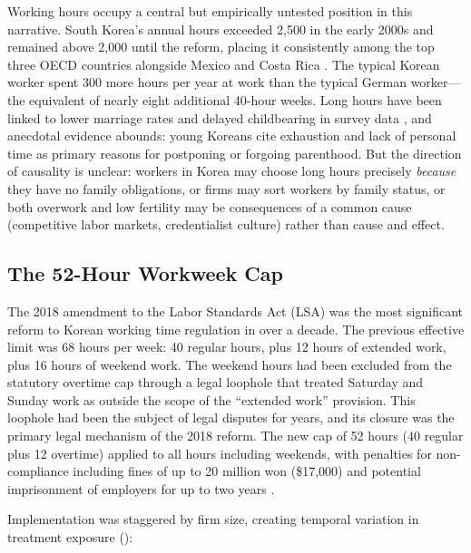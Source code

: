 \documentclass[12pt]{article}
\begin{document}
Working hours occupy a central but empirically untested position in this narrative. South Korea's annual hours exceeded 2,500 in the early 2000s and remained above 2,000 until the reform, placing it consistently among the top three OECD countries alongside Mexico and Costa Rica \citep{oecd2023hours}. The typical Korean worker spent 300 more hours per year at work than the typical German worker---the equivalent of nearly eight additional 40-hour weeks. Long hours have been linked to lower marriage rates and delayed childbearing in survey data \citep{choi2020working}, and anecdotal evidence abounds: young Koreans cite exhaustion and lack of personal time as primary reasons for postponing or forgoing parenthood. But the direction of causality is unclear: workers in Korea may choose long hours precisely \textit{because} they have no family obligations, or firms may sort workers by family status, or both overwork and low fertility may be consequences of a common cause (competitive labor markets, credentialist culture) rather than cause and effect.

\subsection{The 52-Hour Workweek Cap}

The 2018 amendment to the Labor Standards Act (LSA) was the most significant reform to Korean working time regulation in over a decade. The previous effective limit was 68 hours per week: 40 regular hours, plus 12 hours of extended work, plus 16 hours of weekend work. The weekend hours had been excluded from the statutory overtime cap through a legal loophole that treated Saturday and Sunday work as outside the scope of the ``extended work'' provision. This loophole had been the subject of legal disputes for years, and its closure was the primary legal mechanism of the 2018 reform. The new cap of 52 hours (40 regular plus 12 overtime) applied to all hours including weekends, with penalties for non-compliance including fines of up to 20 million won (\$17,000) and potential imprisonment of employers for up to two years \citep{moel2018amendment}.

Implementation was staggered by firm size, creating temporal variation in treatment exposure ():
\end{document}
